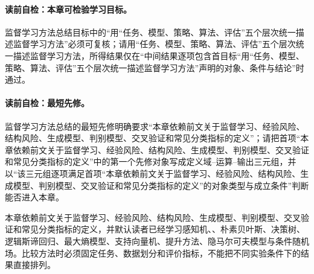 \paragraph{读前自检：本章可检验学习目标。}监督学习方法总结目标中的“用“任务、模型、策略、算法、评估”五个层次统一描述监督学习方法”必须可复核；请用“任务、模型、策略、算法、评估”五个层次统一描述监督学习方法，所得结果仅在“中间结果逐项包含首目标“用“任务、模型、策略、算法、评估”五个层次统一描述监督学习方法”声明的对象、条件与结论”时通过。\par


\label{struct:V3-C07-CH02}
\paragraph{读前自检：最短先修。}监督学习方法总结的最短先修明确要求“本章依赖前文关于监督学习、经验风险、结构风险、生成模型、判别模型、交叉验证和常见分类指标的定义”；请把首项“本章依赖前文关于监督学习、经验风险、结构风险、生成模型、判别模型、交叉验证和常见分类指标的定义”中的第一个先修对象写成定义域--运算--输出三元组，并以“该三元组逐项满足首项“本章依赖前文关于监督学习、经验风险、结构风险、生成模型、判别模型、交叉验证和常见分类指标的定义”的对象类型与成立条件”判断能否进入本章。\par

\begin{prerequisitebox}
本章依赖前文关于监督学习、经验风险、结构风险、生成模型、判别模型、交叉验证和常见分类指标的定义，并默认读者已经学习感知机、\kNN{}、朴素贝叶斯、决策树、逻辑斯谛回归、最大熵模型、支持向量机、提升方法、隐马尔可夫模型与条件随机场。比较方法时必须固定任务、数据划分和评价指标，不能把不同实验条件下的结果直接排列。
\end{prerequisitebox}

